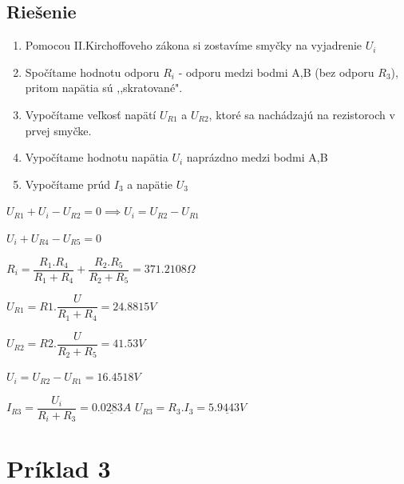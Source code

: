 \documentclass[10pt,a4paper]{article}
\begin{document}
 \subsection*{Riešenie}
 \begin{enumerate}
\item Pomocou II.Kirchoffoveho zákona si zostavíme smyčky na vyjadrenie $U_{i}$
\item Spočítame hodnotu odporu $R_{i}$ - odporu medzi bodmi A,B (bez odporu $R_{3}$), pritom napätia sú ,,skratované".
\item Vypočítame veľkosť napätí $U_{R1}$ a $U_{R2}$, ktoré sa nachádzajú na rezistoroch v prvej smyčke.
\item Vypočítame hodnotu napätia $U_{i}$ naprázdno medzi bodmi A,B
\item Vypočítame prúd $I_{3}$ a napätie $U_{3}$
\end{enumerate}

\vspace*{0.5cm}
$U_{R1} + U_{i} - U_{R2} = 0 \implies U_{i} = U_{R2} - U_{R1}$
	
\vspace*{0.5cm}
	
$U_{i} + U_{R4} - U_{R5} = 0$

\vspace*{0.5cm}
    
$ R_{i}=\dfrac{R_{1}.R_{4}}{ R_{1}+R_{4}}+\dfrac{R_{2}.R_{5}}{R_{2}+R_{5}}=371.2108\Omega$
\vspace*{0.5cm}
    
$ U_{R1}=R1.\dfrac{U}{R_{1}+R_{4}}=24.8815 V$
    
\vspace*{0.5cm}
    
$U_{R2}=R2.\dfrac{U}{R_{2}+R_{5}}=41.53 V$
    
\vspace*{0.5cm}
    
$ U_{i}= U_{R2} - U_{R1} = 16.4518 V$

\vspace*{0.5cm}
    
\begin{center}
$ I_{R3} = \dfrac{U_{i}}{R_{i}+R_{3}}=\underline{0.0283 A}$ \qquad  \qquad $U_{R3}=R_{3}.I_{3}=\underline{5.9443 V}$
\end{center}

\vspace*{0.5cm}

 \newpage
 \section {Príklad 3}
 
\end{document}
